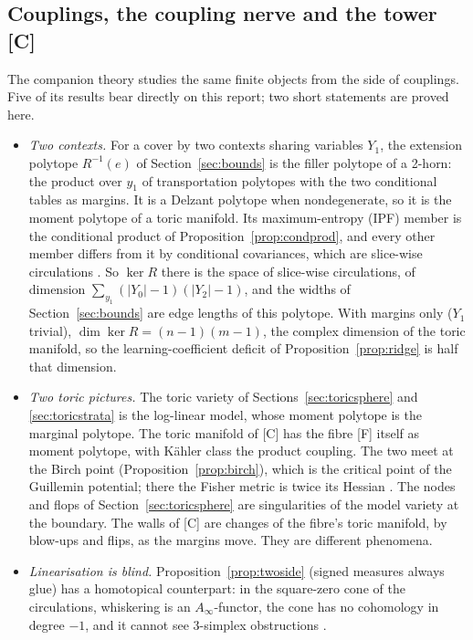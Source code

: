\documentclass[11pt]{article}
\theoremstyle{definition}
\theoremstyle{remark}
\newcommand{\src}[1]{\textsf{\small[#1]}}
\begin{document}
\subsection{Couplings, the coupling nerve and the tower \src{C}}\label{sec:fw-couplings}
The companion theory \cite{awasthiC,awasthiF} studies the same finite objects from the side of couplings. Five of its results bear directly on this report; two short statements are proved here.
\begin{itemize}
  \item \emph{Two contexts.} For a cover by two contexts sharing variables $Y_1$, the extension polytope $R^{-1}(e)$ of Section~\ref{sec:bounds} is the filler polytope of a 2-horn: the product over $y_1$ of transportation polytopes with the two conditional tables as margins. It is a Delzant polytope when nondegenerate, so it is the moment polytope of a toric manifold. Its maximum-entropy (IPF) member is the conditional product of Proposition~\ref{prop:condprod}, and every other member differs from it by conditional covariances, which are slice-wise circulations \cite[Thm.~4.2]{awasthiC}. So $\ker R$ there is the space of slice-wise circulations, of dimension $\sum_{y_1}(|Y_0|-1)(|Y_2|-1)$, and the widths of Section~\ref{sec:bounds} are edge lengths of this polytope. With margins only ($Y_1$ trivial), $\dim\ker R=(n-1)(m-1)$, the complex dimension of the toric manifold, so the learning-coefficient deficit of Proposition~\ref{prop:ridge} is half that dimension.
  \item \emph{Two toric pictures.} The toric variety of Sections~\ref{sec:toricsphere} and \ref{sec:toricstrata} is the log-linear model, whose moment polytope is the marginal polytope. The toric manifold of \src{C} has the fibre [F] itself as moment polytope, with Kähler class the product coupling. The two meet at the Birch point (Proposition~\ref{prop:birch}), which is the critical point of the Guillemin potential; there the Fisher metric is twice its Hessian \cite[Prop.~6.5]{awasthiC}. The nodes and flops of Section~\ref{sec:toricsphere} are singularities of the model variety at the boundary. The walls of \src{C} are changes of the fibre's toric manifold, by blow-ups and flips, as the margins move. They are different phenomena.
  \item \emph{Linearisation is blind.} Proposition~\ref{prop:twoside} (signed measures always glue) has a homotopical counterpart: in the square-zero cone of the circulations, whiskering is an $A_\infty$-functor, the cone has no cohomology in degree $-1$, and it cannot see 3-simplex obstructions \cite[Thm.~5.2, Thm.~10.2, Prop.~10.4]{awasthiC}.

\end{itemize}
\end{document}
